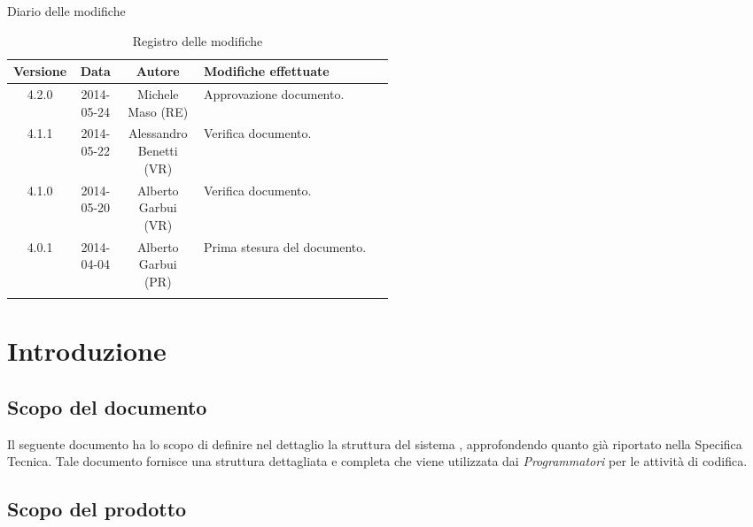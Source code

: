 
\newpage
Diario delle modifiche
\begin{center}
\begin{longtable}{|c|c|c|p{0.5\linewidth}|}
\toprule
\textbf{Versione} & \textbf{Data} & \textbf{Autore} & \textbf{Modifiche effettuate}\\

\midrule
4.2.0 & 2014-05-24 & Michele Maso (RE) & Approvazione documento.\\
\midrule
4.1.1 & 2014-05-22 & Alessandro Benetti (VR) & Verifica documento.\\
\midrule
4.1.0 & 2014-05-20 & Alberto Garbui (VR) & Verifica documento.\\


\midrule
4.0.1 & 2014-04-04 & Alberto Garbui (PR) & Prima stesura del documento.\\

\bottomrule
\caption{Registro delle modifiche}
\label{tab:changelog}

\end{longtable}
\end{center}

\newpage
\tableofcontents

\newpage
\listoffigures %

\newpage
\section{Introduzione}
\subsection{Scopo del documento}
Il seguente documento ha lo scopo di definire nel dettaglio la struttura del sistema , approfondendo quanto già riportato nella Specifica Tecnica. Tale documento fornisce una struttura dettagliata e completa che viene utilizzata dai \emph{Programmatori} per le attività di codifica.

\subsection{Scopo del prodotto}
\Prodotto{}

